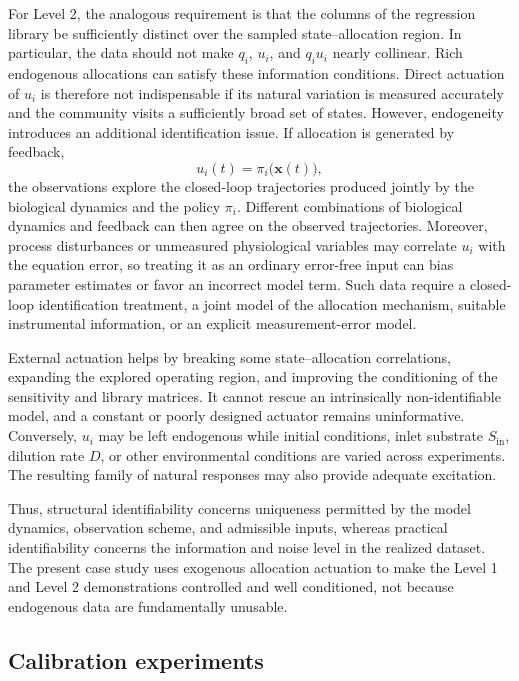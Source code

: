 \documentclass[11pt,a4paper]{article}
\newcommand{\vect}[1]{\boldsymbol{#1}}
\begin{document}
For Level 2, the analogous requirement is that the columns of the regression library be sufficiently distinct over the sampled state--allocation region. In particular, the data should not make \(q_i\), \(u_i\), and \(q_i u_i\) nearly collinear.
Rich endogenous allocations can satisfy these information conditions. Direct actuation of \(u_i\) is therefore not indispensable if its natural variation is measured accurately and the community visits a sufficiently broad set of states. However, endogeneity introduces an additional identification issue. If allocation is generated by feedback,
\begin{equation}
  u_i(t)=\pi_i\bigl(\vect{x}(t)\bigr),
\end{equation}
the observations explore the closed-loop trajectories produced jointly by
the biological dynamics and the policy \(\pi_i\). Different combinations of
biological dynamics and feedback can then agree on the observed trajectories.
Moreover, process disturbances or unmeasured physiological variables may
correlate \(u_i\) with the equation error, so treating it as an ordinary
error-free input can bias parameter estimates or favor an incorrect model
term. Such data require a closed-loop identification treatment, a joint model
of the allocation mechanism, suitable instrumental information, or an
explicit measurement-error model.

External actuation helps by breaking some state--allocation correlations,
expanding the explored operating region, and improving the conditioning of
the sensitivity and library matrices. It cannot rescue an intrinsically
non-identifiable model, and a constant or poorly designed actuator remains
uninformative. Conversely, \(u_i\) may be left endogenous while initial
conditions, inlet substrate \(S_{\mathrm{in}}\), dilution rate \(D\), or other
environmental conditions are varied across experiments. The resulting family
of natural responses may also provide adequate excitation.

Thus, structural identifiability concerns uniqueness permitted by the model dynamics, observation scheme, and admissible inputs, whereas practical identifiability concerns the information and noise level in the realized dataset. The present case study uses exogenous allocation actuation to make the Level 1 and Level 2 demonstrations controlled and well conditioned, not because endogenous data are fundamentally unusable.

\subsection{Calibration experiments}
\end{document}
